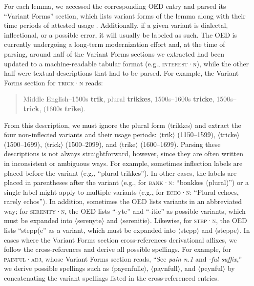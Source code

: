 \documentclass[doc,biblatex]{apa7}
\newcommand\lemma[2]{\textsc{#1·#2}}
\newcommand\spelling[1]{\allowbreak$\langle$#1$\rangle$}
\begin{document}
For each lemma, we accessed the corresponding OED entry and parsed its ``Variant Forms'' section, which lists variant forms of the lemma along with their time periods of attested usage \parencite[see][for discussion]{Durkin:2016}. Additionally, if a given variant is dialectal, inflectional, or a possible error, it will usually be labeled as such. The OED is currently undergoing a long-term modernization effort and, at the time of parsing, around half of the Variant Forms sections we extracted had been updated to a machine-readable tabular format (e.g., \lemma{interest}{n}), while the other half were textual descriptions that had to be parsed. For example, the Variant Forms section for \lemma{trick}{n} reads:
\begin{quote}
Middle English--1500s \textbf{trik}, plural \textbf{trikkes}, 1500s--1600s \textbf{tricke}, 1500s-- \textbf{trick}, (1600s \textbf{trike}).
\end{quote}
From this description, we must ignore the plural form \spelling{trikkes} and extract the four non-inflected variants and their usage periods: \spelling{trik} (1150--1599), \spelling{tricke} (1500--1699), \spelling{trick} (1500--2099), and \spelling{trike} (1600--1699).
Parsing these descriptions is not always straightforward, however, since they are often written in inconsistent or ambiguous ways. For example, sometimes inflection labels are placed before the variant (e.g., ``plural trikkes''). In other cases, the labels are placed in parentheses after the variant (e.g., for \lemma{bank}{n}: ``bonkkes (plural)'') or a single label might apply to multiple variants (e.g., for \lemma{echo}{n}: ``Plural echoes, rarely echos''). In addition, sometimes the OED lists variants in an abbreviated way; for \lemma{serenity}{n}, the OED lists \mbox{``-yte''} and \mbox{``-itie''} as possible variants, which must be expanded into \spelling{serenyte} and \spelling{serenitie}. Likewise, for \lemma{step}{n}, the OED lists ``stepp(e'' as a variant, which must be expanded into \spelling{stepp} and \spelling{steppe}. In cases where the Variant Forms section cross-references derivational affixes, we follow the cross-references and derive all possible spellings. For example, for \lemma{painful}{adj}, whose Variant Forms section reads, ``See \textit{pain n.1} and \textit{-ful suffix},'' we derive possible spellings such as \spelling{payenfulle}, \spelling{paynfull}, and \spelling{peynful} by concatenating the variant spellings listed in the cross-referenced entries.
\end{document}
